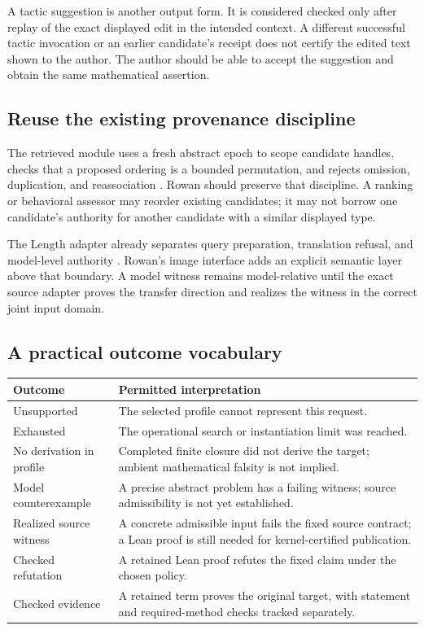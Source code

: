 \documentclass[11pt,letterpaper]{article}
\newcommand{\code}[1]{\texttt{\detokenize{#1}}}
\theoremstyle{definition}\newtheorem{definition}[theorem]{Definition}
\theoremstyle{remark}\newtheorem{remark}[theorem]{Remark}
\begin{document}
A tactic suggestion is another output form. It is considered checked only
after replay of the exact displayed edit in the intended context. A different
successful tactic invocation or an earlier candidate's receipt does not
certify the edited text shown to the author. The author should be able to
accept the suggestion and obtain the same mathematical assertion.

\subsection{Reuse the existing provenance discipline}
The retrieved \code{PostVerification} module uses a fresh abstract epoch to
scope candidate handles, checks that a proposed ordering is a bounded
permutation, and rejects omission, duplication, and reassociation
\cite{leantpost}. Rowan should preserve that discipline. A ranking or
behavioral assessor may reorder existing candidates; it may not borrow one
candidate's authority for another candidate with a similar displayed type.

The Length adapter already separates query preparation, translation refusal,
and model-level authority \cite{leantadapter}. Rowan's image interface adds
an explicit semantic layer above that boundary. A model witness remains
model-relative until the exact source adapter proves the transfer direction
and realizes the witness in the correct joint input domain.

\subsection{A practical outcome vocabulary}
\begin{center}\small
\begin{tabularx}{\textwidth}{@{}P{.26\textwidth}Y@{}}
\toprule Outcome & Permitted interpretation\\\midrule
Unsupported & The selected profile cannot represent this request.\\
Exhausted & The operational search or instantiation limit was reached.\\
No derivation in profile & Completed finite closure did not derive the target; ambient mathematical falsity is not implied.\\
Model counterexample & A precise abstract problem has a failing witness; source admissibility is not yet established.\\
Realized source witness & A concrete admissible input fails the fixed source contract; a Lean proof is still needed for kernel-certified publication.\\
Checked refutation & A retained Lean proof refutes the fixed claim under the chosen policy.\\
Checked evidence & A retained term proves the original target, with statement and required-method checks tracked separately.\\
\bottomrule
\end{tabularx}
\end{center}
\end{document}
